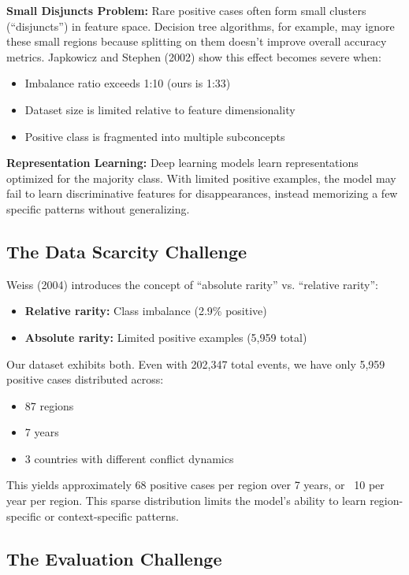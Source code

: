 \documentclass{article}
\begin{document}
\textbf{Small Disjuncts Problem:} Rare positive cases often form small clusters (``disjuncts'') in feature space. Decision tree algorithms, for example, may ignore these small regions because splitting on them doesn't improve overall accuracy metrics. Japkowicz and Stephen (2002) show this effect becomes severe when:
\begin{itemize}
    \item Imbalance ratio exceeds 1:10 (ours is 1:33)
    \item Dataset size is limited relative to feature dimensionality
    \item Positive class is fragmented into multiple subconcepts
\end{itemize}

\textbf{Representation Learning:} Deep learning models learn representations optimized for the majority class. With limited positive examples, the model may fail to learn discriminative features for disappearances, instead memorizing a few specific patterns without generalizing.

\subsection{The Data Scarcity Challenge}

Weiss (2004) introduces the concept of ``absolute rarity'' vs. ``relative rarity'':
\begin{itemize}
    \item \textbf{Relative rarity:} Class imbalance (2.9\% positive)
    \item \textbf{Absolute rarity:} Limited positive examples (5,959 total)
\end{itemize}

Our dataset exhibits both. Even with 202,347 total events, we have only 5,959 positive cases distributed across:
\begin{itemize}
    \item 87 regions
    \item 7 years
    \item 3 countries with different conflict dynamics
\end{itemize}

This yields approximately 68 positive cases per region over 7 years, or ~10 per year per region. This sparse distribution limits the model's ability to learn region-specific or context-specific patterns.

\subsection{The Evaluation Challenge}
\end{document}
